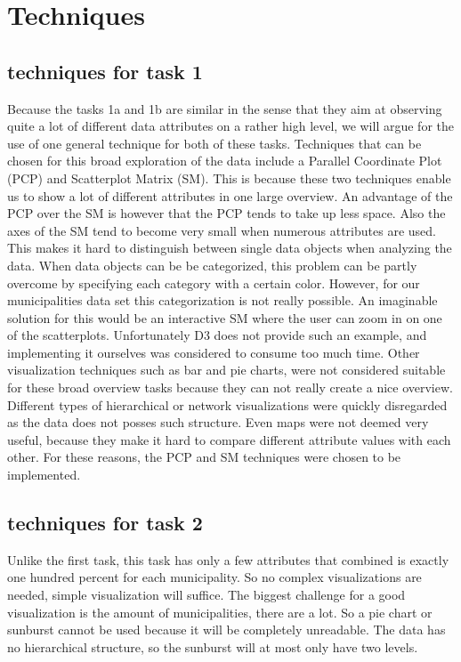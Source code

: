 \section{Techniques}

\subsection{techniques for task 1}
Because the tasks 1a and 1b are similar in the sense that they aim at observing quite a lot of different data attributes on a rather high level, we will argue for the use of one general technique for both of these tasks. Techniques that can be chosen for this broad exploration of the data include a Parallel Coordinate Plot (PCP) and Scatterplot Matrix (SM). This is because these two techniques enable us to show a lot of different attributes in one large overview. An advantage of the PCP over the SM is however that the PCP tends to take up less space. Also the axes of the SM tend to become very small when numerous attributes are used. This makes it hard to distinguish between single data objects when analyzing the data. When data objects can be be categorized, this problem can be partly overcome by specifying each category with a certain color. However, for our municipalities data set this categorization is not really possible. An imaginable solution for this would be an interactive SM where the user can zoom in on one of the scatterplots. Unfortunately D3 \cite{D3} does not provide such an example, and implementing it ourselves was considered to consume too much time.
Other visualization techniques such as bar and pie charts, were not considered suitable for these broad overview tasks because they can not really create a nice overview. Different types of hierarchical or network visualizations were quickly disregarded as the data does not posses such structure. Even maps were not deemed very useful, because they make it hard to compare different attribute values with each other. For these reasons, the PCP and SM techniques were chosen to be implemented.



\subsection{techniques for task 2}
Unlike the first task, this task has only a few attributes that combined is exactly one hundred percent for each municipality.
So no complex visualizations are needed, simple visualization will suffice.
The biggest challenge for a good visualization is the amount of municipalities, there are a lot.
So a pie chart or sunburst cannot be used because it will be completely unreadable.
The data has no hierarchical structure, so the sunburst will at most only have two levels.

